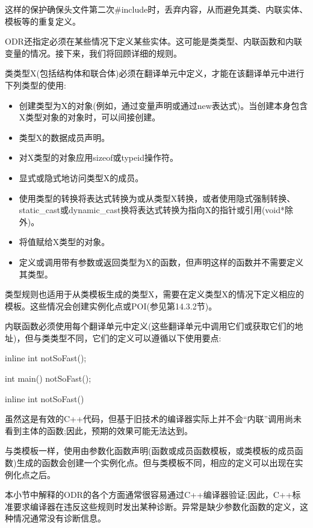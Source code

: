 这样的保护确保头文件第二次\#include时，丢弃内容，从而避免其类、内联实体、模板等的重复定义。

ODR还指定必须在某些情况下定义某些实体。这可能是类类型、内联函数和内联变量的情况。接下来，我们将回顾详细的规则。

类类型X(包括结构体和联合体)必须在翻译单元中定义，才能在该翻译单元中进行下列类型的使用:

\begin{itemize}
\item 
创建类型为X的对象(例如，通过变量声明或通过new表达式)。当创建本身包含X类型对象的对象时，可以间接创建。

\item 
类型X的数据成员声明。

\item 
对X类型的对象应用sizeof或typeid操作符。

\item 
显式或隐式地访问类型X的成员。

\item 
使用类型的转换将表达式转换为或从类型X转换，或者使用隐式强制转换、static\_cast或dynamic\_cast换将表达式转换为指向X的指针或引用(void*除外)。

\item 
将值赋给X类型的对象。

\item 
定义或调用带有参数或返回类型为X的函数，但声明这样的函数并不需要定义其类型。
\end{itemize}

类型规则也适用于从类模板生成的类型X，需要在定义类型X的情况下定义相应的模板。这些情况会创建实例化点或POI(参见第14.3.2节)。

内联函数必须使用每个翻译单元中定义(这些翻译单元中调用它们或获取它们的地址)，但与类类型不同，它们的定义可以遵循以下使用要点:

\begin{cpp}
inline int notSoFast();

int main()
{
	notSoFast();
}

inline int notSoFast()
{ }
\end{cpp}

虽然这是有效的C++代码，但基于旧技术的编译器实际上并不会“内联”调用尚未看到主体的函数;因此，预期的效果可能无法达到。

与类模板一样，使用由参数化函数声明(函数或成员函数模板，或类模板的成员函数)生成的函数会创建一个实例化点。但与类模板不同，相应的定义可以出现在实例化点之后。

本小节中解释的ODR的各个方面通常很容易通过C++编译器验证;因此，C++标准要求编译器在违反这些规则时发出某种诊断。异常是缺少参数化函数的定义，这种情况通常没有诊断信息。

